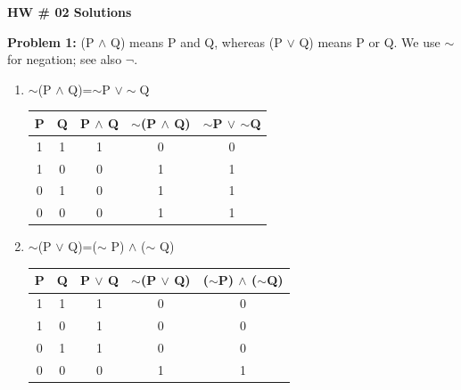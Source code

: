 \documentclass[letterpaper]{article}
\begin{document}
\newcommand{\trace}{\mathrm{trace}}
\newcommand{\real}{\mathbb R}  %
\newcommand{\nat}{\mathbb R}   %
\newcommand{\cp}{\mathbb C}    %
\newcommand{\ds}{\displaystyle}
\newcommand{\mf}[2]{\frac{\ds #1}{\ds #2}}
\newcommand{\book}[2]{{Luenberger, Page~#1, }{Prob.~#2}}
\newcommand{\spanof}[1]{\textrm{span} \{ #1 \}}
\parindent 0pt


\begin{center}
{\large \bf HW \# 02 Solutions}
\end{center}

\vspace*{1cm}


\noindent \textbf{Problem 1:}
(P $\land$ Q) means P and Q, whereas (P $\lor$ Q) means P or Q.
We use $\sim$ for negation; see also $\neg$.
\begin{enumerate}
\setlength{\itemsep}{.1in}
\renewcommand{\labelenumi}{(\alph{enumi})}
\item  $\sim$(P $\land$ Q)=$\sim$P $\lor\sim$Q
\begin{center}
\begin{tabular}{|c|c|c|c|c|}
\hline
P & Q & P $\land$ Q & $\sim$(P $\land$ Q) & $\sim$P $\lor$ $\sim$Q \\ \hline
1 & 1 & 1 & 0 & 0 \\
1 & 0 & 0 & 1 & 1 \\
0 & 1 & 0 & 1 & 1 \\
0 & 0 & 0 & 1 & 1 \\ \hline
\end{tabular}
\end{center}

\item  $\sim$(P $\lor$ Q)=($\sim$ P) $\land$ ($\sim$ Q)
\begin{center}
\begin{tabular}{|c|c|c|c|c|}
\hline
P & Q & P $\lor$ Q & $\sim$(P $\lor$ Q) & ($\sim$P) $\land$ ($\sim$Q) \\ \hline
1 & 1 & 1 & 0 & 0 \\
1 & 0 & 1 & 0 & 0 \\
0 & 1 & 1 & 0 & 0 \\
0 & 0 & 0 & 1 & 1 \\ \hline
\end{tabular}
\end{center}
\end{enumerate}

\bigskip
\end{document}

